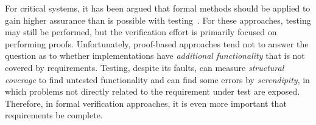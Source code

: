 For critical systems, it has been argued that formal methods
should be applied to gain higher assurance than is possible with testing~\cite{Miller10:CACM,Rushby09:SEFM,Hardin09:Security}.  For these approaches, testing may still be performed, but the verification effort is primarily focused on performing proofs.  Unfortunately, proof-based approaches tend not to answer the question as to whether implementations have {\em additional functionality} that is not covered by requirements.  Testing, despite its faults, can measure {\em structural coverage} to find untested functionality and can find some errors by {\em serendipity}, in which problems not directly related to the requirement under test are exposed.  Therefore, in formal verification approaches, it is even more important that requirements be complete.

